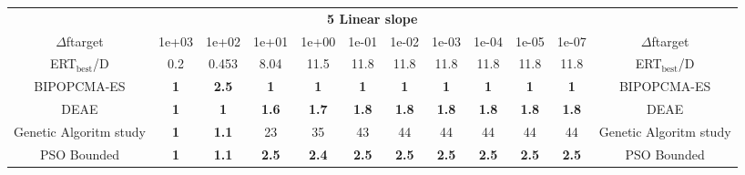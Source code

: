 \begin{tabular}{cccccccccccc}
 & \multicolumn{10}{c}{{\normalsize \textbf{5 Linear slope}}}\\
$\Delta$ftarget& 1e+03& 1e+02& 1e+01& 1e+00& 1e-01& 1e-02& 1e-03& 1e-04& 1e-05& 1e-07 & $\Delta$ftarget \\
ERT$_{\textrm{best}}$/D& 0.2& 0.453& 8.04& 11.5& 11.8& 11.8& 11.8& 11.8& 11.8& 11.8 & ERT$_{\textrm{best}}$/D \\
\hline
BIPOPCMA-ES & \textbf{1} & \textbf{2.5} & \textbf{1} & \textbf{1} & \textbf{1} & \textbf{1} & \textbf{1} & \textbf{1} & \textbf{1} & \textbf{1} & BIPOPCMA-ES \cite{add_an_entry_for_BIPOPCMA-ES_in_bbob.bib}\\
DEAE & \textbf{1} & \textbf{1} & \textbf{1.6} & \textbf{1.7} & \textbf{1.8} & \textbf{1.8} & \textbf{1.8} & \textbf{1.8} & \textbf{1.8} & \textbf{1.8} & DEAE \cite{add_an_entry_for_DEAE_in_bbob.bib}\\
Genetic Algoritm study & \textbf{1} & \textbf{1.1} & 23 & 35 & 43 & 44 & 44 & 44 & 44 & 44 & Genetic Algoritm study \cite{add_an_entry_for_Genetic Algoritm study_in_bbob.bib}\\
PSO Bounded & \textbf{1} & \textbf{1.1} & \textbf{2.5} & \textbf{2.4} & \textbf{2.5} & \textbf{2.5} & \textbf{2.5} & \textbf{2.5} & \textbf{2.5} & \textbf{2.5} & PSO Bounded \cite{add_an_entry_for_PSO Bounded_in_bbob.bib}
\end{tabular}
